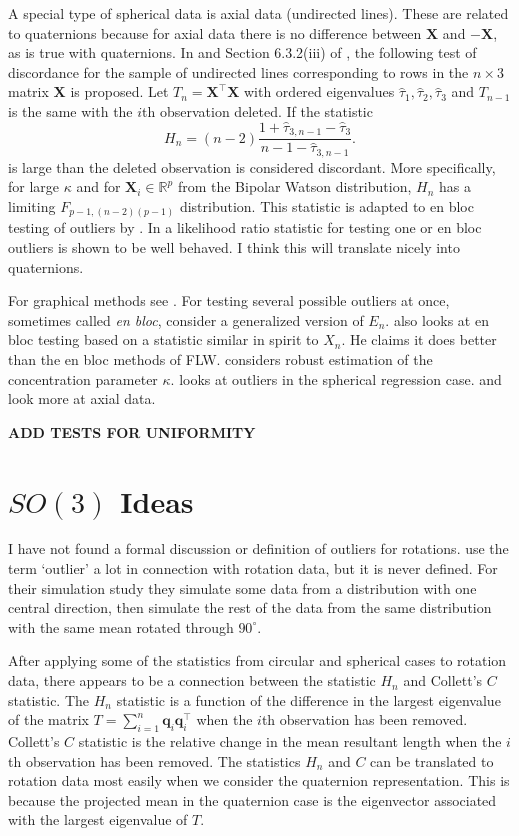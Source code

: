 \documentclass{article}\usepackage{graphicx, color}
\newcommand{\R}{{\mathbb{R}}}
\begin{document}
A special type of spherical data is axial data (undirected lines).  These are related to quaternions because for axial data there is no difference between $\bm X$ and $-\bm X$, as is true with quaternions.  In \cite{best1986} and Section 6.3.2(iii) of \cite{fisher1987}, the following test of discordance for the sample of undirected lines corresponding to rows in the $n\times 3$ matrix $\bm X$ is proposed.  Let $T_n=\bm X^\top\bm X$ with ordered eigenvalues $\hat\tau_1,\hat\tau_2,\hat\tau_3$ and $T_{n-1}$ is the same with the $i$th observation deleted.  If the statistic
\[
H_n=(n-2)\frac{1+\hat\tau_{3,n-1}-\hat\tau_3}{n-1-\hat\tau_{3,n-1}}.
\]
is large than the deleted observation is considered discordant.  More specifically, for large $\kappa$ and for $\bm X_i\in \R^p$ from the Bipolar Watson distribution, $H_n$ has a limiting $F_{p-1,(n-2)(p-1)}$ distribution.  This statistic is adapted to en bloc testing of outliers by \cite{figueiredo2005}.  In \cite{figueiredo2007} a likelihood ratio statistic for testing one or en bloc outliers is shown to be well behaved.  I think this will translate nicely into quaternions.




For graphical methods see \cite{lewis1982}.  For testing several possible outliers at once, sometimes called {\it en bloc}, \cite{fisher1981} consider a generalized version of $E_n$. \cite{kimber1985} also looks at en bloc testing based on a statistic similar in spirit to $X_n$.  He claims it does better than the en bloc methods of FLW.   \cite{fisher1982} considers robust estimation of the concentration parameter $\kappa$.   \cite{rivest1989} looks at outliers in the spherical regression case.   \cite{best1986} and \cite{fisher1987} look more at axial data.

{\bf ADD TESTS FOR UNIFORMITY}


\section{$SO(3)$ Ideas}

I have not found a formal discussion or definition of outliers for rotations. \cite{fletcher2008} use the term `outlier' a lot in connection with rotation data, but it is never defined.  For their simulation study they simulate some data from a distribution with one central direction, then simulate the rest of the data from the same distribution with the same mean rotated through $90^\circ$.

After applying some of the statistics from circular and spherical cases to rotation data, there appears to be a connection between the statistic $H_n$ and Collett's $C$ statistic.  The $H_n$ statistic is a function of the difference in the largest eigenvalue of the matrix $T=\sum_{i=1}^n\bm q_i\bm q_i^\top$ when the $i$th observation has been removed.  Collett's $C$ statistic is the relative change in the mean resultant length when the $i$th observation has been removed.   The statistics $H_n$ and $C$ can be translated to rotation data most easily when we consider the quaternion representation.  This is because the projected mean in the quaternion case is the eigenvector associated with the largest eigenvalue of $T$.  
\end{document}

